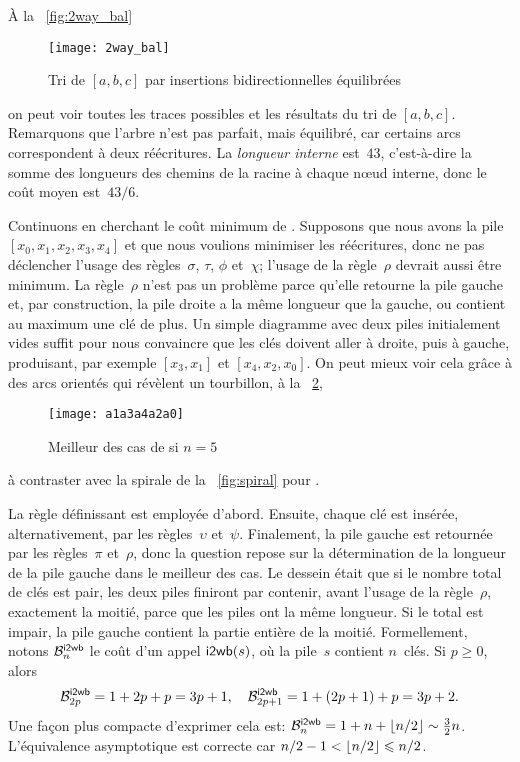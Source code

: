 À la \fig~\vref{fig:2way_bal}
\begin{figure}
\centering
\texttt{[image: 2way\_bal]}
\caption{Tri de \([a,b,c]\) par insertions bidirectionnelles équilibrées}
\label{fig:2way_bal}
\end{figure}
on peut voir toutes les traces possibles et les résultats du tri de \([a,b,c]\). Remarquons que
l'arbre n'est pas parfait, mais équilibré,
car certains arcs correspondent à deux réécritures. La \emph{longueur
  interne}\label{insertion__internal_path_length}  est~\(43\), c'est-à-dire la somme des
longueurs des chemins de la racine à chaque n{\oe}ud interne, donc le
coût moyen est~\(43/6\).


Continuons en cherchant le coût minimum de . Supposons que
nous avons la pile \([x_0, x_1, x_2, x_3, x_4]\) et que nous voulions
minimiser les réécritures, donc ne pas déclencher l'usage des
règles~\(\sigma\), \(\tau\), \(\phi\) et~\(\chi\); l'usage de la
règle~\(\rho\) devrait aussi être minimum. La règle~\(\rho\) n'est pas
un problème parce qu'elle retourne la pile gauche et, par
construction, la pile droite a la même longueur que la gauche, ou
contient au maximum une clé de plus. Un simple diagramme avec deux
piles initialement vides suffit pour nous convaincre que les clés
doivent aller à droite, puis à gauche, produisant, par exemple \([x_3
, x_1]\) et \([x_4, x_2, x_0]\). On peut mieux voir cela grâce à des
arcs orientés qui révèlent un tourbillon, à la
\fig~\ref{fig:whirlpool},
\begin{figure}[b]
\centering
\texttt{[image: a1a3a4a2a0]}
\caption{Meilleur des cas de  si \(n=5\)}
\label{fig:whirlpool}
\end{figure}
à contraster avec la spirale de la \fig~\vref{fig:spiral} pour
.

La règle définissant  est employée d'abord. Ensuite, chaque
clé est insérée, alternativement, par les règles~\(\upsilon\)
et~\(\psi\). Finalement, la pile gauche est retournée par les
règles~\(\pi\) et~\(\rho\), donc la question repose sur la
détermination de la longueur de la pile gauche dans le meilleur des
cas. Le dessein était que si le nombre total de clés est pair, les
deux piles finiront par contenir, avant l'usage de la règle~\(\rho\),
exactement la moitié, parce que les piles ont la même longueur. Si le
total est impair, la pile gauche contient la partie entière de la
moitié. Formellement, notons \(\B{\fun{i2wb}}{n}\) le coût d'un appel
\(\fun{i2wb}(s)\), où la pile~\(s\) contient \(n\)~clés. Si \(p
\geqslant 0\), alors
\begin{equation*}
\B{\fun{i2wb}}{2p}   = 1 +     2p + p = 3p + 1,\quad
\B{\fun{i2wb}}{2p+1} = 1 + (2p+1) + p = 3p + 2.
\end{equation*}
Une façon plus compacte d'exprimer cela est: \(\B{\fun{i2wb}}{n} = 1 +
n + \floor{n/2} \sim \tfrac{3}{2}{n}\). L'équivalence asymptotique est
correcte car \(n/2-1 < \floor{n/2} \leqslant n/2\).

